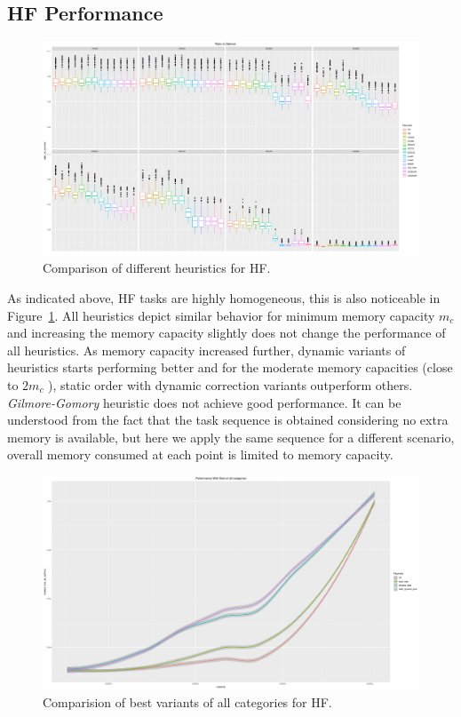 \documentclass[sigconf]{acmart}
\begin{document}
	\subsection{HF Performance}	
	\begin{figure}[htb]
		\includegraphics[scale=0.25]{./results/plots/ratio_to_optimal_selected_hf.pdf}
		\caption{Comparison of different heuristics for HF.}
		\label{fig:ratio_to_optimal_hf}
	\end{figure}
	As indicated above, HF tasks are highly homogeneous, this is also noticeable in Figure~\ref{fig:ratio_to_optimal_hf}. All heuristics depict similar behavior for minimum memory capacity $m_c$  and  increasing the memory capacity slightly does not change the performance of all heuristics. As memory capacity increased further, dynamic variants of heuristics starts performing better and for the moderate memory capacities (close to $2m_c$ ), static order with dynamic correction variants outperform others. \textit{Gilmore-Gomory} heuristic does not achieve good performance. It can be understood from the fact that the task sequence is obtained considering no extra memory is available, but here we apply the same sequence for a different scenario,  overall memory consumed at each point is limited to memory capacity.
	
	
	\begin{figure}[htb]
		\includegraphics[scale=0.15]{./results/plots/inverse_ratio_to_optimal_hf-best.pdf}
		\caption{Comparision of best variants of all categories for HF.}
		\label{fig:ratio_to_optimal_best_hf}
	\end{figure}
	
\end{document}
